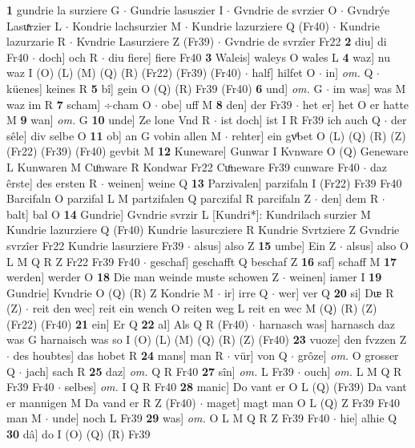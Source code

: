 \documentclass[8pt,a4paper,notitlepage]{article}
\begin{document}
\begin{table}[ht]
\begin{minipage}[t]{0.5\linewidth}
\textbf{1} gundrie la surziere G  $\cdot$ Gundrie lasuszier I  $\cdot$ Gvndrie de svrzier O  $\cdot$ Gvndrýe Lasuͯrzier L  $\cdot$ Kondrie lachsurzier M  $\cdot$ Kundrie lazurziere Q (Fr40)  $\cdot$ Kundrie lazurzarie R  $\cdot$ Kvndrie Lasurziere Z (Fr39)  $\cdot$ Gvndrie de svrzîer Fr22 \textbf{2} diu] di Fr40  $\cdot$ doch] och R  $\cdot$ diu fiere] fiere Fr40 \textbf{3} Waleis] waleys O wales L \textbf{4} waz] nu waz I (O) (L) (M) (Q) (R) (Fr22) (Fr39) (Fr40)  $\cdot$ half] hilfet O  $\cdot$ in] \textit{om.} Q  $\cdot$ küenes] keines R \textbf{5} bî] gein O (Q) (R) Fr39 (Fr40) \textbf{6} und] \textit{om.} G  $\cdot$ im was] was M waz im R \textbf{7} scham] ÷cham O  $\cdot$ obe] uff M \textbf{8} den] der Fr39  $\cdot$ het er] het O er hatte M \textbf{9} wan] \textit{om.} G \textbf{10} unde] Ze lone Vnd R  $\cdot$ ist doch] ist I R Fr39 ich auch Q  $\cdot$ der sêle] div selbe O \textbf{11} ob] an G vobin allen M  $\cdot$ rehter] ein gvͦbet O (L) (Q) (R) (Z) (Fr22) (Fr39) (Fr40) gevbit M \textbf{12} Kuneware] Gunwar I Kvnware O (Q) Geneware L Kunwaren M Cuͦnware R Kondwar Fr22 Cuͦneware Fr39 cunware Fr40  $\cdot$ daz êrste] des ersten R  $\cdot$ weinen] weine Q \textbf{13} Parzivalen] parzifaln I (Fr22) Fr39 Fr40 Barcifaln O parzifal L M partzifalen Q parczifal R parcifaln Z  $\cdot$ den] dem R  $\cdot$ balt] bal O \textbf{14} Gundrie] Gvndrie svrzir L [Kundri*]: Kundrilach surzier M Kundrie lazurziere Q (Fr40) Kundrie lasurcziere R Kundrie Svrtziere Z Gvndrie svrzîer Fr22 Kundrie lasurziere Fr39  $\cdot$ alsus] also Z \textbf{15} umbe] Ein Z  $\cdot$ alsus] also O L M Q R Z Fr22 Fr39 Fr40  $\cdot$ geschaf] geschafft Q beschaf Z \textbf{16} saf] schaff M \textbf{17} werden] werder O \textbf{18} Die man weinde muste schowen Z  $\cdot$ weinen] iamer I \textbf{19} Gundrie] Kvndrie O (Q) (R) Z Kondrie M  $\cdot$ ir] irre Q  $\cdot$ wer] ver Q \textbf{20} si] Dᵫ R (Z)  $\cdot$ reit den wec] reit ein wench O reiten weg L reit en wec M (Q) (R) (Z) (Fr22) (Fr40) \textbf{21} ein] Er Q \textbf{22} al] Als Q R (Fr40)  $\cdot$ harnasch was] harnasch daz was G harnaisch was so I (O) (L) (M) (Q) (R) (Z) (Fr40) \textbf{23} vuoze] den fvzzen Z  $\cdot$ des houbtes] das hobet R \textbf{24} mans] man R  $\cdot$ vür] von Q  $\cdot$ grôze] \textit{om.} O grosser Q  $\cdot$ jach] sach R \textbf{25} daz] \textit{om.} Q R Fr40 \textbf{27} sîn] \textit{om.} L Fr39  $\cdot$ ouch] \textit{om.} L M Q R Fr39 Fr40  $\cdot$ selbes] \textit{om.} I Q R Fr40 \textbf{28} manic] Do vant er O L (Q) (Fr39) Da vant er mannigen M Da vand er R Z (Fr40)  $\cdot$ maget] magt man O L (Q) Z Fr39 Fr40 man M  $\cdot$ unde] noch L Fr39 \textbf{29} was] \textit{om.} O L M Q R Z Fr39 Fr40  $\cdot$ hie] alhie Q \textbf{30} dâ] do I (O) (Q) (R) Fr39 \newline

\end{minipage}
\end{table}
\end{document}
